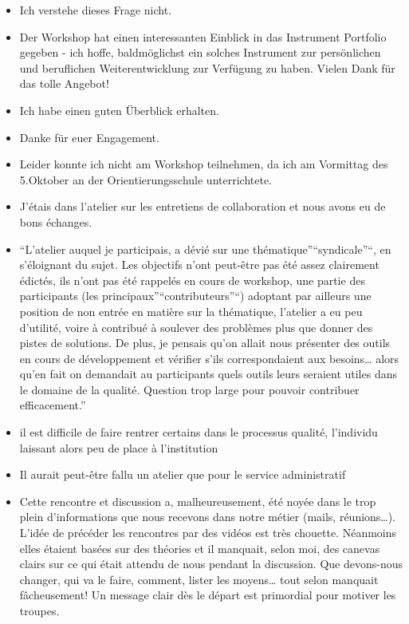\documentclass[
  french,
]{article}
\providecommand{\tightlist}{%
  \setlength{\itemsep}{0pt}\setlength{\parskip}{0pt}}
\begin{document}
\begin{itemize}
\tightlist
\item
  Ich verstehe dieses Frage nicht.
\item
  Der Workshop hat einen interessanten Einblick in das Instrument Portfolio gegeben - ich hoffe, baldmöglichst ein solches Instrument zur persönlichen und beruflichen Weiterentwicklung zur Verfügung zu haben.
  Vielen Dank für das tolle Angebot!
\item
  Ich habe einen guten Überblick erhalten.
\item
  Danke für euer Engagement.
\item
  Leider konnte ich nicht am Workshop teilnehmen, da ich am Vormittag des 5.Oktober an der Orientierungsschule unterrichtete.
\item
  J'étais dans l'atelier sur les entretiens de collaboration et nous avons eu de bons échanges.
\item
  ``L'atelier auquel je participais, a dévié sur une thématique''``syndicale''``, en s'éloignant du sujet. Les objectifs n'ont peut-être pas été assez clairement édictés, ils n'ont pas été rappelés en cours de workshop, une partie des participants (les principaux''``contributeurs''``) adoptant par ailleurs une position de non entrée en matière sur la thématique, l'atelier a eu peu d'utilité, voire à contribué à soulever des problèmes plus que donner des pistes de solutions. De plus, je pensais qu'on allait nous présenter des outils en cours de développement et vérifier s'ils correspondaient aux besoins\ldots{} alors qu'en fait on demandait au participants quels outils leurs seraient utiles dans le domaine de la qualité. Question trop large pour pouvoir contribuer efficacement.''
\item
  il est difficile de faire rentrer certains dans le processus qualité, l'individu laissant alors peu de place à l'institution
\item
  Il aurait peut-être fallu un atelier que pour le service administratif
\item
  Cette rencontre et discussion a, malheureusement, été noyée dans le trop plein d'informations que nous recevons dans notre métier (mails, réunions\ldots). L'idée de précéder les rencontres par des vidéos est très chouette. Néanmoins elles étaient basées sur des théories et il manquait, selon moi, des canevas clairs sur ce qui était attendu de nous pendant la discussion. Que devons-nous changer, qui va le faire, comment, lister les moyens\ldots{} tout selon manquait fâcheusement! Un message clair dès le départ est primordial pour motiver les troupes.

\end{itemize}
\end{document}
